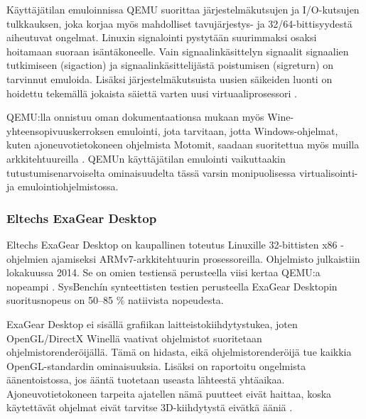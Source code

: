 Käyttäjätilan emuloinnissa QEMU suorittaa järjestelmäkutsujen ja I/O-kutsujen tulkkauksen, joka korjaa myös mahdolliset tavujärjestys- ja 32/64-bittisyydestä aiheutuvat ongelmat. Linuxin signalointi pystytään suurimmaksi osaksi hoitamaan suoraan isäntäkoneelle. Vain signaalinkäsittelyn signaalit signaalien tutkimiseen (sigaction) ja signaalinkäsittelijästä poistumisen (sigreturn) on tarvinnut emuloida. Lisäksi järjestelmäkutsuista uusien säikeiden luonti on hoidettu tekemällä jokaista säiettä varten uusi virtuaaliprosessori \cite{qemu_tech}.

QEMU:lla onnistuu oman dokumentaationsa mukaan myös Wine-yhteensopivuuskerroksen emulointi, jota tarvitaan, jotta Windows-ohjelmat, kuten ajoneuvotietokoneen ohjelmista Motomit, saadaan suoritettua myös muilla arkkitehtuureilla \cite{qemu_use}. QEMUn käyttäjätilan emulointi vaikuttaakin tutustumisenarvoiselta ominaisuudelta tässä varsin monipuolisessa virtualisointi- ja emulointiohjelmistossa.


\subsubsection{Eltechs ExaGear Desktop}
Eltechs ExaGear Desktop on kaupallinen toteutus Linuxille 32-bittisten x86 -ohjelmien ajamiseksi ARMv7-arkkitehtuurin prosessoreilla. Ohjelmisto julkaistiin lokakuussa 2014. Se on omien testiensä perusteella viisi kertaa QEMU:a nopeampi \cite{eltechs:exagear}. SysBenchín synteettisten testien perusteella ExaGear Desktopin suoritusnopeus on 50--85 \% natiivista nopeudesta.

ExaGear Desktop ei sisällä grafiikan laitteistokiihdytystukea, joten OpenGL/DirectX Winellä vaativat ohjelmistot suoritetaan ohjelmistorenderöijällä. Tämä on hidasta, eikä ohjelmistorenderöijä tue kaikkia OpenGL-standardin ominaisuuksia. Lisäksi on raportoitu ongelmista äänentoistossa, jos ääntä tuotetaan useasta lähteestä yhtäaikaa. Ajoneuvotietokoneen tarpeita ajatellen nämä puutteet eivät haittaa, koska käytettävät ohjelmat eivät tarvitse 3D-kiihdytystä eivätkä ääniä \cite{eltechs:odroid}.


